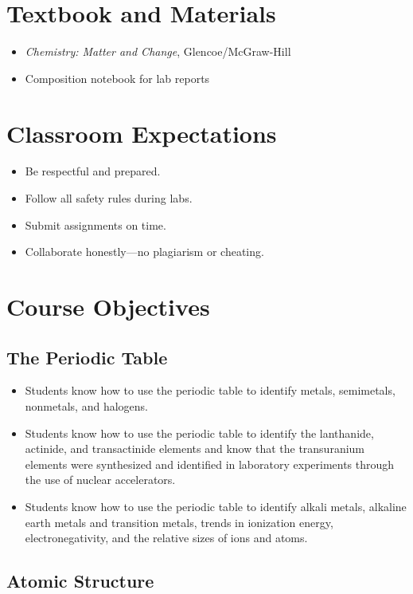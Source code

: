 \documentclass[12pt]{article}
\begin{document}
\section*{Textbook and Materials}
\begin{itemize}
    \item \textit{Chemistry: Matter and Change}, Glencoe/McGraw-Hill
    \item Composition notebook for lab reports
\end{itemize}

\section*{Classroom Expectations}
\begin{itemize}
    \item Be respectful and prepared.
    \item Follow all safety rules during labs.
    \item Submit assignments on time.
    \item Collaborate honestly—no plagiarism or cheating.
\end{itemize}


\section{Course Objectives}
\subsection{The Periodic Table}

\begin{itemize}
    \item Students know how to use the periodic table to identify metals, semimetals, nonmetals, and halogens.
    \item Students know how to use the periodic table to identify the lanthanide, actinide, and transactinide elements and know that the transuranium elements were synthesized and identified in laboratory experiments through the use of nuclear accelerators.
    \item Students know how to use the periodic table to identify alkali metals, alkaline earth metals and transition metals, trends in ionization energy, electronegativity, and the relative sizes of ions and atoms.
\end{itemize}


\subsection{Atomic Structure}
\end{document}
